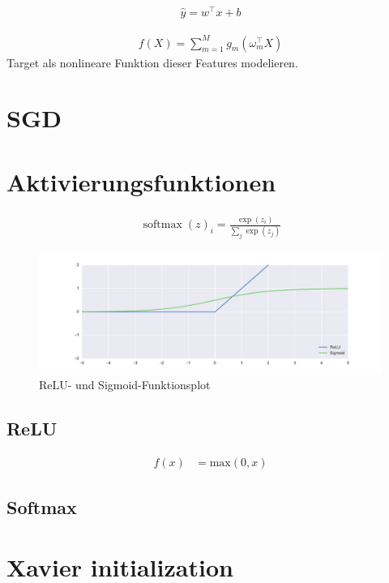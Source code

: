 \begin{align}
    \hat { y } = w^{ \top } x + b
\end{align}



\begin{align}
    f(X)=\sum\limits_{m=1}^{M}g_{m}\left(\omega_{m}^{\top}X\right)
   \end{align}
Target als nonlineare Funktion dieser Features modelieren.  


\section{SGD}

\section{Aktivierungsfunktionen}
\begin{align}
    \operatorname{softmax}(z)_{i}=\frac{\exp\left(z_{i}\right)}{ \sum _ { j } \exp \left( z _ { j } \right) }
\end{align}
\begin{figure}
    \caption{ReLU- und Sigmoid-Funktionsplot}
    \includegraphics[width=\textwidth]{figures/plot/relu_sigmoid.pdf}
\end{figure}

\subsection{ReLU}
\begin{align}
    f\left(x\right) &= \text{max}(0,x)
\end{align}
\subsection{Softmax}


\section{Xavier initialization}

